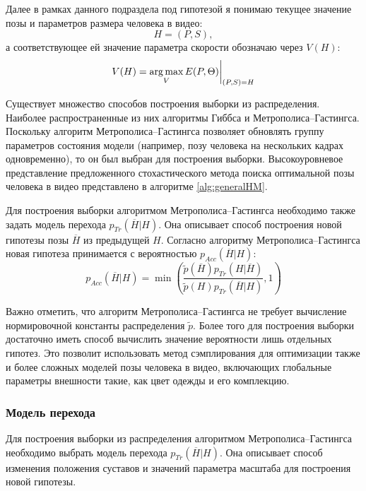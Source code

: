 Далее в рамках данного подраздела под гипотезой я понимаю текущее значение позы и параметров размера человека в видео:
\begin{equation}
	H = \left(P, S\right),
\end{equation}
а соответствующее ей значение параметра скорости обозначаю через $V(H)$:
\begin{equation}
	V(H) = \operatorname*{arg\,max}_V{E(P, \Theta)}\bigg\rvert_{(P, S) = H}
\end{equation}

Существует множество способов построения выборки из распределения. Наиболее распространенные из них алгоритмы Гиббса и Метрополиса--Гастингса. Поскольку алгоритм Метрополиса--Гастингса позволяет обновлять группу параметров состояния модели (например, позу человека на нескольких кадрах одновременно), то он был выбран для построения выборки. Высокоуровневое представление предложенного стохастического метода поиска оптимальной позы человека в видео представлено в алгоритме \ref{alg:generalHM}. 

Для построения выборки алгоритмом Метрополиса--Гастингса необходимо также задать модель перехода $p_{Tr}(\overline{H}|H)$. Она описывает способ построения новой гипотезы позы $\overline{H}$ из предыдущей $H$. Согласно алгоритму Метрополиса--Гастингса новая гипотеза принимается с вероятностью $p_{Acc}(\overline{H}|H)$:
\begin{equation}
p_{Acc}(\overline{H}|H) = \min{\left(\frac
	{\tilde{p}(\overline{H}) p_{Tr}(H|\overline{H})}
	{\tilde{p}(H) p_{Tr}(\overline{H}|H)}, 1\right)}
	\label{eq::MH_acc}
\end{equation}

Важно отметить, что алгоритм Метрополиса--Гастингса не требует вычисление нормировочной константы распределения $\tilde{p}$. Более того для построения выборки достаточно иметь способ вычислить значение вероятности лишь отдельных гипотез. Это позволит использовать метод сэмплирования для оптимизации также и более сложных моделей позы человека в видео, включающих глобальные параметры внешности такие, как цвет одежды и его комплекцию.

\subsubsection{Модель перехода}

Для построения выборки из распределения алгоритмом Метрополиса--Гастингса необходимо выбрать модель перехода $p_{Tr}(\overline{H}|H)$. Она описывает способ изменения положения суставов и значений параметра масштаба для построения новой гипотезы.

